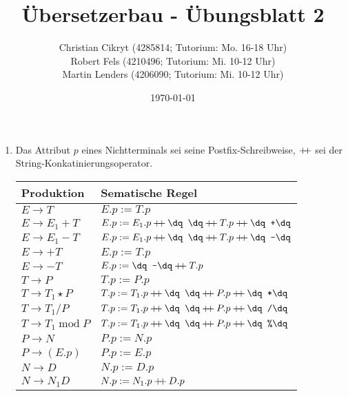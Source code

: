 \documentclass[a4paper,10pt]{scrartcl}
\title{Übersetzerbau - Übungsblatt 2}
\author{Christian Cikryt (4285814; Tutorium: Mo. 16-18 Uhr)\\
  Robert Fels (4210496; Tutorium: Mi. 10-12 Uhr)\\
  Martin Lenders (4206090; Tutorium: Mi. 10-12 Uhr)
  }
\date{\today}
\begin{document}
\maketitle

\section{}
\newcommand{\str}[1]{\texttt{\dq #1\dq}}
\newcommand{\print}[1]{\{\texttt{print(\dq #1\dq})\}}
\newcommand\dplus{\ensuremath{\mathbin{+\mkern-50mu+}}}
\begin{enumerate}
 \newcommand\concat{\ensuremath{\mathbin{+\mkern-5mu+}}}
 \item  Das Attribut $p$ eines Nichtterminals sei seine Postfix-Schreibweise, $\concat$ sei der String-Konkatinierungsoperator.
        \begin{center}
            \begin{tabular}{l|l}
                \textbf{Produktion} & \textbf{Sematische Regel} \\\hline
                $E \to T$                       & $E.p := T.p$ \\
                $E \to E_1 + T$                 & $E.p := E_1.p \concat \str{ } \concat T.p \concat \str{ +}$ \\
                $E \to E_1 - T$                 & $E.p := E_1.p \concat \str{ } \concat T.p \concat \str{ -}$ \\
                $E \to +T$                      & $E.p := T.p$ \\
                $E \to -T$                      & $E.p := \str{-} \concat T.p$ \\
                $T \to P$                       & $T.p := P.p$ \\
                $T \to T_1 \star P$             & $T.p := T_1.p \concat \str{ } \concat P.p \concat \str{ *}$\\
                $T \to T_1 / P$                 & $T.p := T_1.p \concat \str{ } \concat P.p \concat \str{ /}$\\
                $T \to T_1 \operatorname{mod} P$& $T.p := T_1.p \concat \str{ } \concat P.p \concat \str{ \%}$\\
                $P \to N$                       & $P.p := N.p$\\
                $P \to (E.p)$                   & $P.p := E.p$\\
                $N \to D$                       & $N.p := D.p$\\
                $N \to N_1D$                    & $N.p := N_1.p \concat D.p$\\

\end{tabular}
\end{center}
\end{enumerate}
\end{document}
